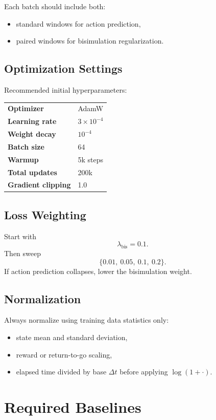 \documentclass[11pt]{article}
\begin{document}
Each batch should include both:
\begin{itemize}[leftmargin=1.5em]
    \item standard windows for action prediction,
    \item paired windows for bisimulation regularization.
\end{itemize}

\subsection{Optimization Settings}
Recommended initial hyperparameters:
\begin{center}
\begin{tabular}{>{\bfseries}p{}p{}}
\toprule
Optimizer & AdamW \\
Learning rate & $3 \times 10^{-4}$ \\
Weight decay & $10^{-4}$ \\
Batch size & 64 \\
Warmup & 5k steps \\
Total updates & 200k \\
Gradient clipping & 1.0 \\
\bottomrule
\end{tabular}
\end{center}

\subsection{Loss Weighting}
Start with
\[
\lambda_{\text{bis}} = 0.1.
\]
Then sweep
\[
\{0.01,\ 0.05,\ 0.1,\ 0.2\}.
\]
If action prediction collapses, lower the bisimulation weight.

\subsection{Normalization}
Always normalize using training data statistics only:
\begin{itemize}[leftmargin=1.5em]
    \item state mean and standard deviation,
    \item reward or return-to-go scaling,
    \item elapsed time divided by base $\Delta t$ before applying $\log(1 + \cdot)$.
\end{itemize}

\section{Required Baselines}
\end{document}
